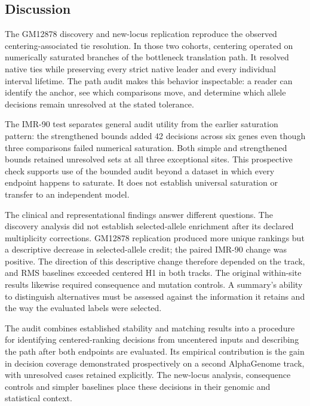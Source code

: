 \documentclass[
  11pt,
]{article}
\begin{document}
\subsection{Discussion}\label{discussion}

The GM12878 discovery and new-locus replication reproduce the observed
centering-associated tie resolution. In those two cohorts, centering
operated on numerically saturated branches of the bottleneck translation
path. It resolved native ties while preserving every strict native
leader and every individual interval lifetime. The path audit makes this
behavior inspectable: a reader can identify the anchor, see which
comparisons move, and determine which allele decisions remain unresolved
at the stated tolerance.

The IMR-90 test separates general audit utility from the earlier
saturation pattern: the strengthened bounds added 42 decisions across
six genes even though three comparisons failed numerical saturation.
Both simple and strengthened bounds retained unresolved sets at all
three exceptional sites. This prospective check supports use of the
bounded audit beyond a dataset in which every endpoint happens to
saturate. It does not establish universal saturation or transfer to an
independent model.

The clinical and representational findings answer different questions.
The discovery analysis did not establish selected-allele enrichment
after its declared multiplicity corrections. GM12878 replication
produced more unique rankings but a descriptive decrease in
selected-allele credit; the paired IMR-90 change was positive. The
direction of this descriptive change therefore depended on the track,
and RMS baselines exceeded centered H1 in both tracks. The original
within-site results likewise required consequence and mutation controls.
A summary's ability to distinguish alternatives must be assessed against
the information it retains and the way the evaluated labels were
selected.

The audit combines established stability and matching results into a
procedure for identifying centered-ranking decisions from uncentered
inputs and describing the path after both endpoints are evaluated. Its
empirical contribution is the gain in decision coverage demonstrated
prospectively on a second AlphaGenome track, with unresolved cases
retained explicitly. The new-locus analysis, consequence controls and
simpler baselines place these decisions in their genomic and statistical
context.
\end{document}
